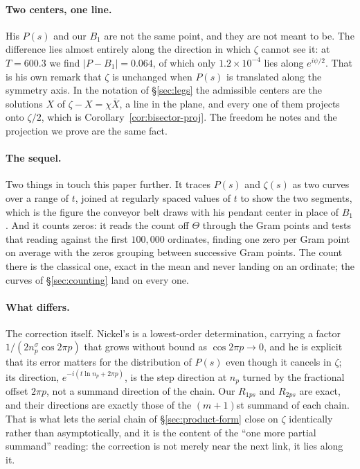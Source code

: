 \documentclass[11pt]{article}
\theoremstyle{definition}
\begin{document}
\paragraph{Two centers, one line.} His $P(s)$ and our $B_1$ are not the same
point, and they are not meant to be. The difference lies almost entirely
along the direction in which $\zeta$ cannot see it: at $T=600.3$ we find
$|P-B_1|=0.064$, of which only $1.2\times10^{-4}$ lies along $e^{i\psi/2}$.
That is his own remark that $\zeta$ is unchanged when $P(s)$ is translated
along the symmetry axis. In the notation of \S\ref{sec:legs} the
admissible centers are the solutions $X$ of $\zeta-X=\chi\overline{X}$, a
line in the plane, and every one of them projects onto $\zeta/2$, which is
Corollary~\ref{cor:bisector-proj}. The freedom he notes and the projection we
prove are the same fact.

\paragraph{The sequel.} Two things in \cite{Nickel2015} touch this paper
further. It traces $P(s)$ and $\zeta(s)$ as two curves over a range of $t$,
joined at regularly spaced values of $t$ to show the two segments, which is the
figure the conveyor belt draws with his
pendant center in place of $B_1$. And it counts zeros: it reads the count off
$\Theta$ through the Gram points and tests that reading against the first
$100{,}000$ ordinates, finding one zero per Gram point on average with the zeros
grouping between successive Gram points. The count there is the classical one,
exact in the mean and never landing on an ordinate; the curves of
\S\ref{sec:counting} land on every one.

\paragraph{What differs.} The correction itself. Nickel's is a lowest-order
determination, carrying a factor $1/(2n_p^{\sigma}\cos 2\pi p)$ that grows
without bound as $\cos2\pi p\to0$, and he is explicit that its error matters
for the distribution of $P(s)$ even though it cancels in $\zeta$; its
direction, $e^{-i(t\ln n_p+2\pi p)}$, is the step direction at $n_p$ turned
by the fractional offset $2\pi p$, not a summand direction of the chain. Our
$R_{1ps}$ and $R_{2ps}$ are exact, and their directions are exactly those of
the $(m+1)$st summand of each chain. That is what lets the serial chain of
\S\ref{sec:product-form} close on $\zeta$ identically rather than
asymptotically, and it is the content of the ``one more partial summand''
reading: the correction is not merely near the next link, it lies along it.
\end{document}
